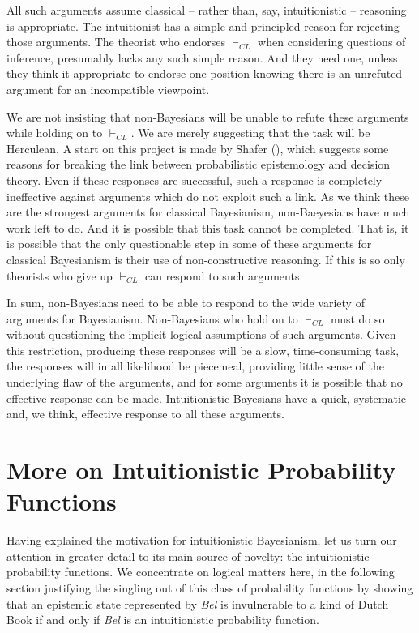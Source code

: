 \documentclass[
  10pt,
  letterpaper,
  DIV=11,
  numbers=noendperiod,
  twoside]{scrartcl}
\begin{document}
All such arguments assume classical -- rather than, say, intuitionistic
-- reasoning is appropriate. The intuitionist has a simple and
principled reason for rejecting those arguments. The theorist who
endorses \(\vdash_{CL}\) when considering questions of inference,
presumably lacks any such simple reason. And they need one, unless they
think it appropriate to endorse one position knowing there is an
unrefuted argument for an incompatible viewpoint.

We are not insisting that non-Bayesians will be unable to refute these
arguments while holding on to \(\vdash_{CL}\). We are merely suggesting
that the task will be Herculean. A start on this project is made by
Shafer (), which suggests some reasons
for breaking the link between probabilistic epistemology and decision
theory. Even if these responses are successful, such a response is
completely ineffective against arguments which do not exploit such a
link. As we think these are the strongest arguments for classical
Bayesianism, non-Baeyesians have much work left to do. And it is
possible that this task cannot be completed. That is, it is possible
that the only questionable step in some of these arguments for classical
Bayesianism is their use of non-constructive reasoning. If this is so
only theorists who give up \(\vdash_{CL}\) can respond to such
arguments.

In sum, non-Bayesians need to be able to respond to the wide variety of
arguments for Bayesianism. Non-Bayesians who hold on to \(\vdash_{CL}\)
must do so without questioning the implicit logical assumptions of such
arguments. Given this restriction, producing these responses will be a
slow, time-consuming task, the responses will in all likelihood be
piecemeal, providing little sense of the underlying flaw of the
arguments, and for some arguments it is possible that no effective
response can be made. Intuitionistic Bayesians have a quick, systematic
and, we think, effective response to all these arguments.

\section{More on Intuitionistic Probability
Functions}\label{more-on-intuitionistic-probability-functions}

Having explained the motivation for intuitionistic Bayesianism, let us
turn our attention in greater detail to its main source of novelty: the
intuitionistic probability functions. We concentrate on logical matters
here, in the following section justifying the singling out of this class
of probability functions by showing that an epistemic state represented
by \emph{Bel} is invulnerable to a kind of Dutch Book if and only if
\emph{Bel} is an intuitionistic probability function.
\end{document}
